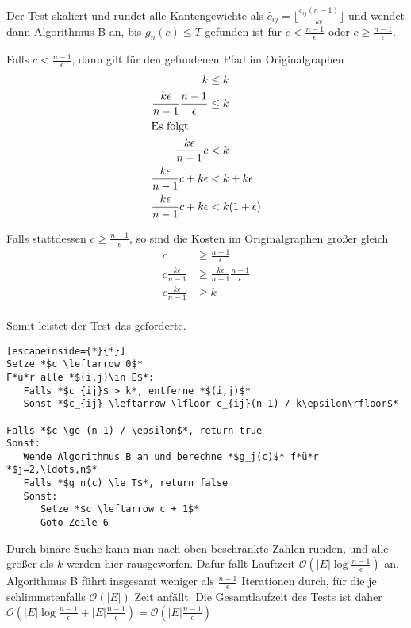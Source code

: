\documentclass{article}
\begin{document}
Der Test skaliert und rundet alle Kantengewichte als $\hat{c}_{ij} =
\lfloor\frac{c_{ij} (n-1)}{k\epsilon}\rfloor$ und wendet dann Algorithmus B an,
bis $g_n(c) \le T$ gefunden ist für $c < \frac{n-1}{\epsilon}$ oder $c \ge
\frac{n-1}{\epsilon}$.

Falls $c < \frac{n-1}{\epsilon}$, dann gilt für den gefundenen Pfad im
Originalgraphen
\begin{align*}
   k & \le k \\
   \frac{k\epsilon}{n-1} \frac{n-1}{\epsilon} & \le k \\
   \intertext{Es folgt}
   \frac{k\epsilon}{n-1} c & < k \\
   \frac{k\epsilon}{n-1} c + k\epsilon& < k + k\epsilon\\
   \frac{k\epsilon}{n-1} c + k\epsilon& < k(1+\epsilon)\\
\end{align*}

Falls stattdessen $c \ge \frac{n-1}{\epsilon}$, so sind die Kosten im
Originalgraphen größer gleich
\begin{align*}
   c & \ge \frac{n-1}{\epsilon} \\
   c \frac{k\epsilon}{n-1} & \ge \frac{k\epsilon}{n-1}\frac{n-1}{\epsilon} \\
   c \frac{k\epsilon}{n-1} & \ge k \\
\end{align*}

Somit leistet der Test das geforderte.
\begin{lstlisting}[escapeinside={*}{*}]
Setze *$c \leftarrow 0$*
F*ü*r alle *$(i,j)\in E$*:
   Falls *$c_{ij}$ > k*, entferne *$(i,j)$*
   Sonst *$c_{ij} \leftarrow \lfloor c_{ij}(n-1) / k\epsilon\rfloor$*

Falls *$c \ge (n-1) / \epsilon$*, return true
Sonst: 
   Wende Algorithmus B an und berechne *$g_j(c)$* f*ü*r *$j=2,\ldots,n$*
   Falls *$g_n(c) \le T$*, return false
   Sonst:
      Setze *$c \leftarrow c + 1$*
      Goto Zeile 6
\end{lstlisting}
 Durch binäre Suche kann man nach oben beschränkte Zahlen runden, und alle
 größer als $k$ werden hier rausgeworfen. Dafür fällt Lauftzeit
 $\mathcal{O}\left(|E|\log{\frac{n-1}{\epsilon}}\right)$ an. Algorithmus B führt insgesamt
 weniger als $\frac{n-1}{\epsilon}$ Iterationen durch, für die je
 schlimmstenfalls $\mathcal{O}\left(|E|\right)$ Zeit anfällt. Die Gesamtlaufzeit des Tests
 ist daher $\mathcal{O}\left(|E|\log{\frac{n-1}{\epsilon}} + |E|\frac{n-1}{\epsilon}\right)
 = \mathcal{O}\left(|E|\frac{n-1}{\epsilon}\right)
$
\end{document}
